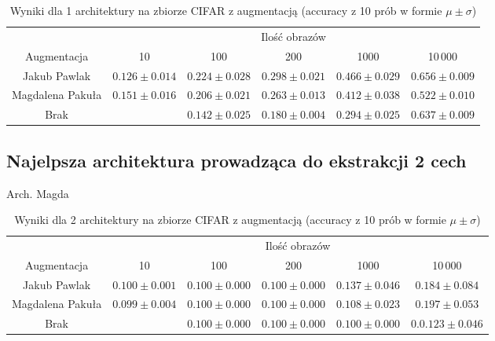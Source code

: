 \documentclass[10pt]{article}
\begin{document}
\begin{table}[H]\centering
    \begin{tabular}{cccccc}
        \toprule
                         & \multicolumn{5}{c}{Ilość obrazów}                                                                                    \\ \cmidrule{2-6}
        Augmentacja      & 10                                & 100                & 200                & 1000              & 10\,000            \\ \midrule
        Jakub Pawlak     & $0.126 \pm 0.014 $                & $0.224 \pm 0.028 $ & $0.298 \pm 0.021 $ & $0.466 \pm 0.029$ & $0.656 \pm 0.009 $ \\
        Magdalena Pakuła & $0.151 \pm 0.016 $                &  $0.206 \pm 0.021$ & $0.263 \pm 0.013 $ & $0.412 \pm 0.038$  & $0.522 \pm 0.010$    \\
        Brak             &                                   & $0.142 \pm 0.025$  & $0.180 \pm 0.004$  & $0.294 \pm 0.025$ & $0.637 \pm 0.009$  \\
        \bottomrule
    \end{tabular}
    \caption{Wyniki dla 1 architektury na zbiorze CIFAR z augmentacją (accuracy z 10 prób w formie $\mu \pm \sigma$)}\label{tab:augmented_cifar_big}
\end{table}

\subsection*{Najelpsza architektura prowadząca do ekstrakcji 2 cech}

Arch. Magda

\begin{table}[H]\centering
    \begin{tabular}{cccccc}
        \toprule
                         & \multicolumn{5}{c}{Ilość obrazów}                                                                                    \\ \cmidrule{2-6}
        Augmentacja      & 10                                & 100                & 200                & 1000              & 10\,000            \\ \midrule
        Jakub Pawlak     & $0.100 \pm 0.001 $                & $ 0.100 \pm 0.000$ & $0.100 \pm 0.000 $ & $0.137 \pm 0.046$ & $0.184 \pm 0.084 $ \\
        Magdalena Pakuła & $0.099 \pm 0.004 $                & $0.100 \pm 0.000$ & $0.100 \pm 0.000 $ & $0.108 \pm 0.023$  & $0.197 \pm 0.053$   \\
        Brak             &                                   & $0.100 \pm 0.000$  & $0.100 \pm 0.000$  & $0.100 \pm 0.000$ & $0.0.123 \pm 0.046$  \\
        \bottomrule
    \end{tabular}
    \caption{Wyniki dla 2 architektury na zbiorze CIFAR z augmentacją (accuracy z 10 prób w formie $\mu \pm \sigma$)}\label{tab:augmented_cifar_small}
\end{table}
\end{document}
